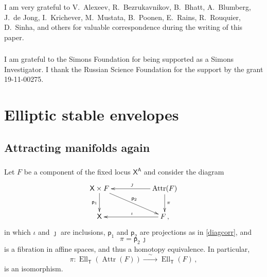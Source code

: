 \documentclass[14pt]{extarticle}
\newcommand{\bT}{\mathsf{T}}
\newcommand{\bA}{\mathsf{A}}
\newcommand{\bX}{\mathsf{X}}
\newcommand{\forp}{\mathsf{p}}
\DeclareMathOperator{\Ell}{Ell}
\DeclareMathOperator{\sAttr}{Attr}
\theoremstyle{definition}
\begin{document}
\subsubsection{}
I am very grateful to  V.~Alexeev, R.~Bezrukavnikov, B.~Bhatt, A.~Blumberg, J.~de
Jong, I.~Krichever, M.~Mustata, B.~Poonen, 
E.~Rains, R.~Rouquier, D.~Sinha, and others for valuable correspondence during
the writing of this paper.

\subsubsection{}
I am grateful to the Simons Foundation for being supported as a Simons
Investigator. I thank the
Russian Science Foundation for the support by the grant  19-11-00275.




\section{Elliptic stable envelopes}

\subsection{Attracting manifolds again} 



\subsubsection{}
Let $F$ be a component of the fixed locus
$\bX^\bA$ and consider the
diagram 
%
\begin{equation}
  \label{corrM}
  \xymatrix{
   \bX \times F \ar[d]_{\forp_1} \ar[drr]^{\forp_2} && \sAttr(F)
   \ar[ll]_{\jmath} \ar[d]^\pi\\
   \bX   && F \ar[ll]_\iota\,,  
    } 
  \end{equation}
  in which $\iota$ and $\jmath$ are inclusions,  $\forp_1$ and
  $\forp_2$ are projections as in \eqref{diagcorr}, and
  $$
  \pi = \forp_2 \, \jmath
  $$
  is a fibration in affine spaces, and thus a homotopy
  equivalence. In particular,
$$
  \pi: \Ell_\bT(\sAttr(F)) \xrightarrow{\quad \sim\quad} \Ell_\bT(F)
  \,, 
  $$
is an isomorphism. 

\subsubsection{} 
\end{document}
